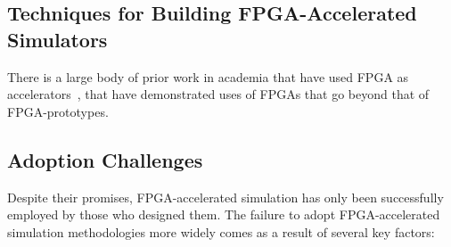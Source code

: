 \subsection{Techniques for Building FPGA-Accelerated Simulators}

There is a large body of prior work in academia that have used FPGA as
accelerators~\cite{fast, fame, hasim, protoflex, ramp, diablo}, that have demonstrated
uses of FPGAs that go beyond that of FPGA-prototypes.




\subsection{Adoption Challenges}

Despite their promises, FPGA-accelerated simulation has only been successfully employed by
those who designed them. The failure to adopt FPGA-accelerated simulation
methodologies more widely comes as a result of several key factors:

